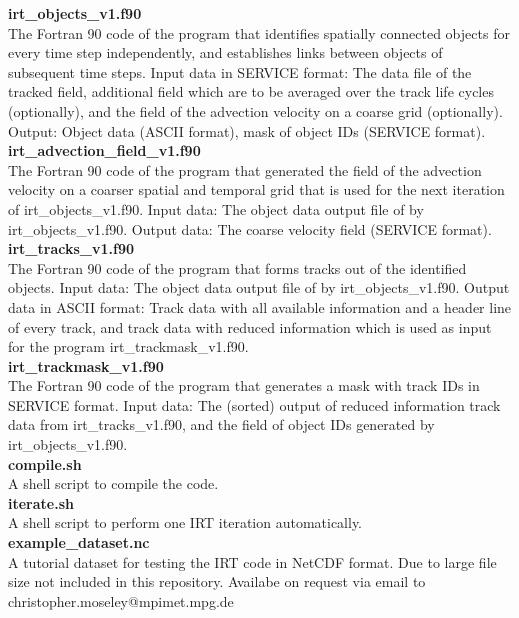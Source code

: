 \documentclass[11pt]{article}
\begin{document}
{\bf irt\_objects\_v1.f90}\\
The Fortran 90 code of the program that identifies spatially connected objects for every time step independently, and establishes links between objects of subsequent time steps. Input data in SERVICE format: The data file of the tracked field, additional field which are to be averaged over the track life cycles (optionally), and the field of the advection velocity on a coarse grid (optionally). Output: Object data (ASCII format), mask of object IDs (SERVICE format). \vspace{0.5cm} \\
{\bf irt\_advection\_field\_v1.f90}\\
The Fortran 90 code of the program that generated the field of the advection velocity on a coarser spatial and temporal grid that is used for the next iteration of irt\_objects\_v1.f90. Input data: The object data output file of by irt\_objects\_v1.f90. Output data: The coarse velocity field (SERVICE format). \vspace{0.5cm} \\
{\bf irt\_tracks\_v1.f90}\\
The Fortran 90 code of the program that forms tracks out of the identified objects. Input data: The object data output file of by irt\_objects\_v1.f90. Output data in ASCII format: Track data with all available information and a header line of every track, and track data with reduced information which is used as input for the program irt\_trackmask\_v1.f90. \vspace{0.5cm} \\
{\bf irt\_trackmask\_v1.f90}\\
The Fortran 90 code of the program that generates a mask with track IDs in SERVICE format. Input data: The (sorted) output of reduced information track data from irt\_tracks\_v1.f90, and the field of object IDs generated by irt\_objects\_v1.f90. \vspace{0.5cm} \\
{\bf compile.sh}\\
A shell script to compile the code. \vspace{0.5cm} \\
{\bf iterate.sh}\\
A shell script to perform one IRT iteration automatically. \vspace{0.5cm} \\
{\bf example\_dataset.nc}\\
A tutorial dataset for testing the IRT code in NetCDF format. Due to large file size not included in this repository. Availabe on request via email to christopher.moseley@mpimet.mpg.de
\end{document}
